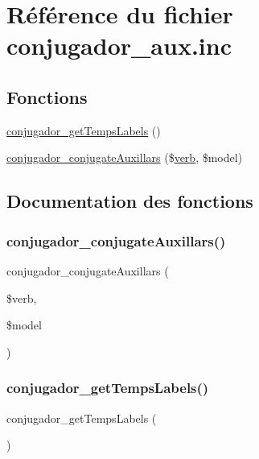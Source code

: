\hypertarget{conjugador__aux_8inc}{}\section{Référence du fichier conjugador\+\_\+aux.\+inc}
\label{conjugador__aux_8inc}
\subsection*{Fonctions}
\begin{DoxyCompactItemize}
\item 
\hyperlink{conjugador__aux_8inc_a801a76b62499e2f4a721fe28c13acf88}{conjugador\+\_\+get\+Temps\+Labels} ()
\item 
\hyperlink{conjugador__aux_8inc_a8d8c244688cc069920895b0ac91a3cfa}{conjugador\+\_\+conjugate\+Auxillars} (\$\hyperlink{teibase_8php_aa8d8fadfcf4239c7aa288414da9d0ace}{verb}, \$model)
\end{DoxyCompactItemize}


\subsection{Documentation des fonctions}
\hypertarget{conjugador__aux_8inc_a8d8c244688cc069920895b0ac91a3cfa}{}\label{conjugador__aux_8inc_a8d8c244688cc069920895b0ac91a3cfa} 
\subsubsection{\texorpdfstring{conjugador\+\_\+conjugate\+Auxillars()}{conjugador\_conjugateAuxillars()}}
{\footnotesize\ttfamily conjugador\+\_\+conjugate\+Auxillars (\begin{DoxyParamCaption}\item[{}]{\$verb,  }\item[{}]{\$model }\end{DoxyParamCaption})}

\hypertarget{conjugador__aux_8inc_a801a76b62499e2f4a721fe28c13acf88}{}\label{conjugador__aux_8inc_a801a76b62499e2f4a721fe28c13acf88} 
\subsubsection{\texorpdfstring{conjugador\+\_\+get\+Temps\+Labels()}{conjugador\_getTempsLabels()}}
{\footnotesize\ttfamily conjugador\+\_\+get\+Temps\+Labels (\begin{DoxyParamCaption}{ }\end{DoxyParamCaption})}

